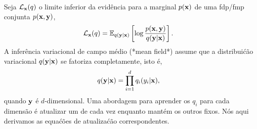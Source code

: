 
\label{ex:MFVI-I}
Seja $\mathcal{L}_{\mathbf{x}}(q)$ o limite inferior da evid\^encia para a marginal $p(\mathbf{x})$ de uma fdp/fmp conjunta $p(\mathbf{x},\mathbf{y})$,
\begin{equation}
    \mathcal{L}_{\mathbf{x}}(q) = \mathbb{E}_{q(\mathbf{y}|\mathbf{x})} \left[\log \frac{p(\mathbf{x},\mathbf{y})}{q(\mathbf{y}|\mathbf{x})}\right].
\end{equation}
A infer\^encia variacional de campo m\'edio (*mean field*) assume que a distribui\'c\~ao variacional $q(\mathbf{y}|\mathbf{x})$ se fatoriza completamente, isto \'e,
\begin{equation}
    q(\mathbf{y} | \mathbf{x}) = \prod_{i=1}^d q_i(y_i | \mathbf{x}),
\end{equation}
quando $\mathbf{y}$ \'e $d$-dimensional. Uma abordagem para aprender os $q_i$ para
cada dimens\~ao \'e atualizar um de cada vez enquanto mant\'em os outros fixos. N\'os
aqui derivamos as equa\'c\~oes de atualiza\'c\~ao correspondentes.



